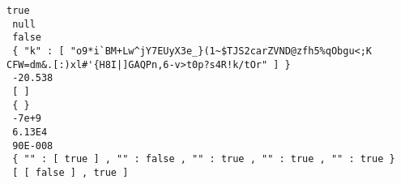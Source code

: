 \begin{minipage}{14cm}
\footnotesize
\begin{lstlisting}[caption=Test Cases covering the JSON grammar shown in Listing~\ref{JSONgrammar}, label=TestJSON]
 true 
 null 
 false 
 { "k" : [ "o9*i`BM+Lw^jY7EUyX3e_}(1~$TJS2carZVND@zfh5%qObgu<;K CFW=dm&.[:)xl#'{H8I|]GAQPn,6-v>t0p?s4R!k/tOr" ] } 
 -20.538 
 [ ] 
 { } 
 -7e+9 
 6.13E4 
 90E-008 
 { "" : [ true ] , "" : false , "" : true , "" : true , "" : true } 
 [ [ false ] , true ] 
\end{lstlisting}
\end{minipage}